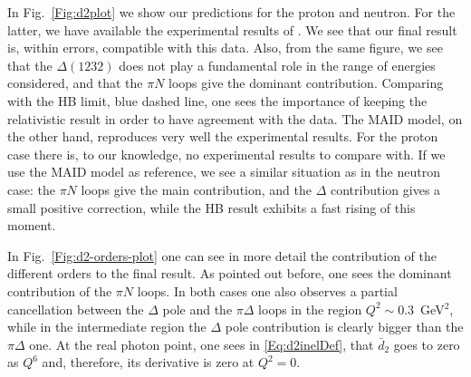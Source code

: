 \documentclass[prc,twocolumn,showpacs,preprintnumbers,amsmath,amssymb
,superscriptaddress,a4paper,nofootinbib
]{revtex4-1}
\begin{document}

In Fig.~\ref{Fig:d2plot} we show our predictions for the proton and neutron. 
For the latter, we have available the experimental results of \cite{Amarian:2003jy}.
We see that our final result is, within errors, compatible with this data.
Also, from the same figure, we see that the $\Delta(1232)$ does not play a fundamental role in the range of energies considered, and that the $\pi N$ loops give the dominant contribution.
Comparing with the HB limit, blue dashed line, one sees the importance of keeping the relativistic result in order to have agreement with the data.
The MAID model, on the other hand, reproduces very well the experimental results.
For the proton case there is, to our knowledge, no experimental results to compare with.
If we use the MAID model as reference, we see a similar situation as in the neutron case: the $\pi N$ loops give the main contribution, and the $\Delta$ contribution gives a small positive correction, while the HB result exhibits a fast rising of this moment.



In Fig.~\ref{Fig:d2-orders-plot} one can see in more detail the contribution of the different orders to the final result. 
As pointed out before, one sees the dominant contribution of the $\pi N$ loops. 
In both cases one also observes a partial cancellation between the $\Delta$ pole and the $\pi \Delta$ loops in the region $Q^2 \sim 0.3$~GeV$^2$, while in the intermediate region the $\Delta$ pole contribution is clearly bigger than the $\pi \Delta$ one.
At the real photon point, one sees in \eqref{Eq:d2inelDef}, that $\bar{d}_2$ goes to zero as $Q^6$ and, therefore, its derivative is zero at $Q^2=0$.
\end{document}
